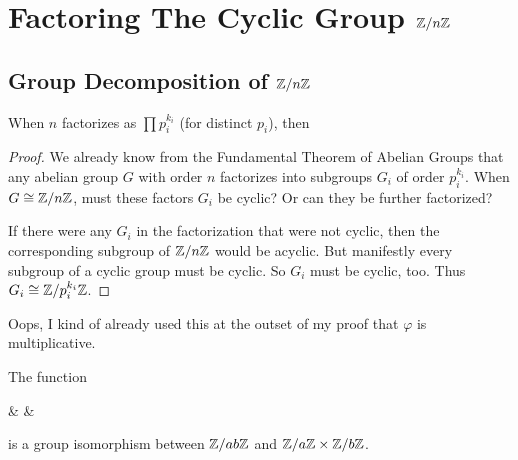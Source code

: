 \section{Factoring The Cyclic Group $\mathbb{Z} / n\mathbb{Z}$}

\subsection{Group Decomposition of $\mathbb{Z} / n\mathbb{Z}$}

\begin{theorem}
  When $n$ factorizes as $\prod p_i^{k_i}$ (for distinct $p_i$), then

  \begin{nedqn}
    \Zmodn
  \congcol
    \times
    \cdots
    \times
  \end{nedqn}
\end{theorem}

\begin{proof}
  We already know from the Fundamental Theorem of Abelian Groups that
  any abelian group $G$ with order $n$ factorizes into subgroups $G_i$
  of order $p_i^{k_i}$.  When $G \cong \mathbb{Z} / n\mathbb{Z}$, must these factors $G_i$
  be cyclic? Or can they be further factorized?

  If there were any $G_i$ in the factorization that were not cyclic,
  then the corresponding subgroup of $\mathbb{Z} / n\mathbb{Z}$ would be acyclic. But
  manifestly every subgroup of a cyclic group must be cyclic. So $G_i$
  must be cyclic, too. Thus $G_i \cong \mathbb{Z} / p_i^{k_i}\mathbb{Z}$.
\end{proof}

\begin{remark}
  Oops, I kind of already used this at the outset of my proof that
  $\varphi$ is multiplicative.
\end{remark}

\begin{theorem}
  The function

  \begin{nedqn}
  & \mapsto &
     \times {}
  \end{nedqn}

  \noindent
  is a group isomorphism between $\mathbb{Z} / ab\mathbb{Z}$ and $\mathbb{Z} / a\mathbb{Z} \times \mathbb{Z} / b\mathbb{Z}$.
\end{theorem}

